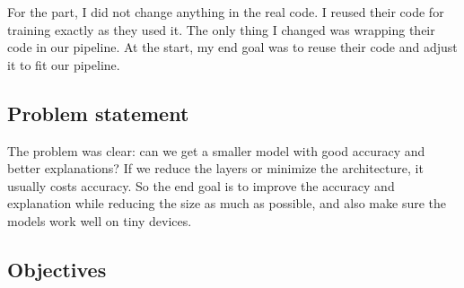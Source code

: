 \begin{priorwork}

{For the \millet{} part, I did not change anything in the real code. I reused their code for \millet{} training exactly as they used it. The only thing I changed was wrapping their code in our pipeline. At the start, my end goal was to reuse their code and adjust it to fit our pipeline.}
\end{priorwork}

\subsection{Problem statement}


{The problem was clear: can we get a smaller model with good accuracy and better explanations? If we reduce the layers or minimize the architecture, it usually costs accuracy. So the end goal is to improve the accuracy and explanation while reducing the size as much as possible, and also make sure the models work well on tiny devices.}

\subsection{Objectives}



